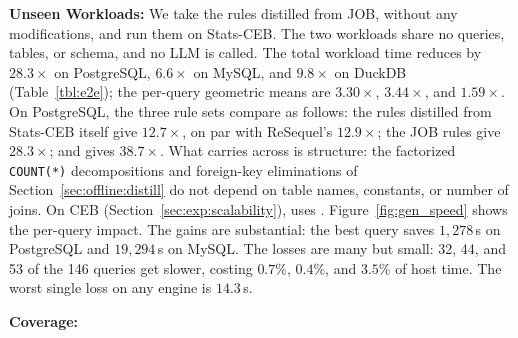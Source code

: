 \textbf{Unseen Workloads:} We take the rules distilled from \textsf{JOB}, without any modifications, and run them on \textsf{Stats-CEB}. The two workloads share no queries, tables, or schema, and no LLM is called. The total workload time reduces by $28.3\times$ on PostgreSQL, $6.6\times$ on MySQL, and $9.8\times$ on DuckDB (Table~\ref{tbl:e2e}); the per-query geometric means are $3.30\times$, $3.44\times$, and $1.59\times$. On PostgreSQL, the three rule sets compare as follows: the rules distilled from \textsf{Stats-CEB} itself give $12.7\times$, on par with ReSequel's $12.9\times$; the \textsf{JOB} rules give $28.3\times$; and  gives $38.7\times$. What carries across is structure: the factorized \texttt{COUNT(*)} decompositions and foreign-key eliminations of Section~\ref{sec:offline:distill} do not depend on table names, constants, or number of joins.
%
On \textsf{CEB} (Section~\ref{sec:exp:scalability}), {\sys} uses .
%
Figure~\ref{fig:gen_speed} shows the per-query impact. The gains are substantial: the best query saves $1{,}278$\,s on PostgreSQL and $19{,}294$\,s on MySQL. The losses are many but small: 32, 44, and 53 of the 146 queries get slower, costing $0.7\%$, $0.4\%$, and $3.5\%$ of host time. The worst single loss on any engine is $14.3$\,s.

\textbf{Coverage:} 


